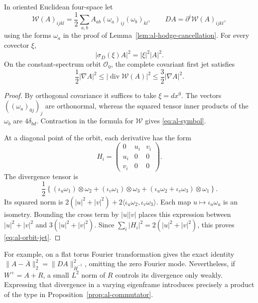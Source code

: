 \begin{lemma}\label{lem:al-symbol}
In oriented Euclidean four-space let
\[
 \mathcal W(A)_{ijkl}
 =\frac12\sum_{a,b}A_{ab}(\omega_a)_{ij}(\omega_b)_{kl},
 \qquad DA=\partial^i\mathcal W(A)_{ijkl},
\]
using the forms $\omega_a$ in the proof of
Lemma~\ref{lem:al-hodge-cancellation}.  For every covector $\xi$,
\begin{equation}\label{eq:al-symbol}
 |\sigma_D(\xi)A|^2=|\xi|^2|A|^2.
\end{equation}
On the constant-spectrum orbit $\mathscr O_0$, the complete covariant
first jet satisfies
\begin{equation}\label{eq:al-orbit-jet}
 \frac12|\nabla A|^2
 \le|\operatorname{div}\mathcal W(A)|^2
 \le\frac32|\nabla A|^2.
\end{equation}
\end{lemma}

\begin{proof}
By orthogonal covariance it suffices to take $\xi=dx^0$.  The vectors
$((\omega_a)_{0j})_j$ are orthonormal, whereas the squared tensor inner
products of the $\omega_b$ are $4\delta_{bd}$.  Contraction in the formula
for $\mathcal W$ gives \eqref{eq:al-symbol}.

At a diagonal point of the orbit, each derivative has the form
\[
 H_i=\begin{pmatrix}0&u_i&v_i\\u_i&0&0\\v_i&0&0\end{pmatrix}.
\]
The divergence tensor is
\[
 \frac12\left\{
 (\iota_u\omega_1)\otimes\omega_2
 +(\iota_v\omega_1)\otimes\omega_3
 +(\iota_u\omega_2+\iota_v\omega_3)\otimes\omega_1\right\}.
\]
Its squared norm is
$2(|u|^2+|v|^2)+2\langle\iota_u\omega_2,\iota_v\omega_3\rangle$.
Each map $u\mapsto\iota_u\omega_a$ is an isometry.  Bounding the cross
term by $|u||v|$ places this expression between
$|u|^2+|v|^2$ and $3(|u|^2+|v|^2)$.  Since
$\sum_i|H_i|^2=2(|u|^2+|v|^2)$, this proves
\eqref{eq:al-orbit-jet}.
\end{proof}

For example, on a flat torus Fourier transformation gives the exact
identity $\|A-\overline A\|_2^2=\|DA\|_{\dot H^{-1}}^2$, omitting the
zero Fourier mode.  Nevertheless, if $W^+=A+R$, a small $L^2$ norm of
$R$ controls its divergence only weakly.  Expressing that divergence in a
varying eigenframe introduces precisely a product of the type in
Proposition~\ref{prop:al-commutator}.

